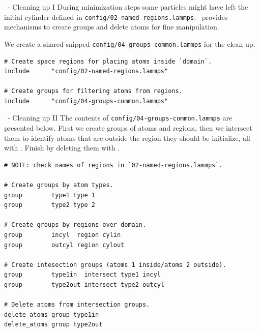 \begin{frame}[fragile]{\secname}{\subsecname\ - Cleaning up I}
During minimization steps some particles might have left the initial cylinder defined in \Verb|config/02-named-regions.lammps|. \LAMMPS\ provides mechanisms to create groups and delete atoms for fine manipulation.

\vspace{0.5cm}

We create a shared snipped \Verb|config/04-groups-common.lammps| for the clean up.

\vspace{0.5cm}

\begin{lstlisting}[language=LAMMPS,basicstyle=\small]
# Create space regions for placing atoms inside `domain`.
include      "config/02-named-regions.lammps"

# Create groups for filtering atoms from regions.
include      "config/04-groups-common.lammps"
\end{lstlisting}
\end{frame}

\begin{frame}[fragile]{\secname}{\subsecname\ - Cleaning up II}
The contents of \Verb|config/04-groups-common.lammps| are presented below. First we create groups of atoms and regions, then we intersect them to identify atoms that are outside the region they should be initialize, all with . Finish by deleting them with .

\vspace{0.5cm}

\begin{lstlisting}[language=LAMMPS,basicstyle=\tiny]
# NOTE: check names of regions in `02-named-regions.lammps`.

# Create groups by atom types.
group        type1 type 1
group        type2 type 2

# Create groups by regions over domain.
group        incyl  region cylin
group        outcyl region cylout

# Create intesection groups (atoms 1 inside/atoms 2 outside).
group        type1in  intersect type1 incyl
group        type2out intersect type2 outcyl

# Delete atoms from intersection groups.
delete_atoms group type1in
delete_atoms group type2out
\end{lstlisting}
\end{frame}

